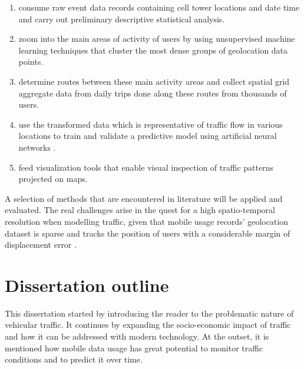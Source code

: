 \documentclass[12pt, a4paper]{report}
\theoremstyle{definition}
\theoremstyle{definition}%
\theoremstyle{definition}%
\theoremstyle{definition}%
\theoremstyle{definition}%
\theoremstyle{definition}%
\begin{document}
\begin{enumerate}
 \item consume raw event data records containing cell tower locations and date time and carry out preliminary descriptive statistical analysis. \label{objective:01}
 
 \item zoom into the main areas of activity of users by using unsupervised machine learning techniques that cluster the most dense groups of geolocation data points. \label{objective:02}
 
 \item  determine routes between these main activity areas and collect spatial grid aggregate data from daily trips done along these routes from thousands of users. \label{objective:03}
 
 \item use the transformed data which is representative of traffic flow in various locations to train and validate a predictive model using artificial neural networks \cite{Calabrese2013,Toole2015,Hoteit2014,Alexander2015}.  \label{objective:04}
 
 \item feed visualization tools that enable visual inspection of traffic patterns projected on maps. \label{objective:05}

\end{enumerate}

A selection of methods that are encountered in literature will be applied and evaluated. The real challenges arise in the quest for a high spatio-temporal resolution when modelling traffic, given that mobile usage records' geolocation dataset is sparse and tracks the position of users with a considerable margin of displacement error \cite{Hoteit2014,Gonzalez2008}.



\section{Dissertation outline} \label{section:introduction:dissertation_outline}
This dissertation started by introducing the reader to the problematic nature of vehicular traffic. It continues by expanding the socio-economic impact of traffic and how it can be addressed with modern technology. At the outset, it is mentioned how mobile data usage has great potential to monitor traffic conditions and to predict it over time.
\end{document}
